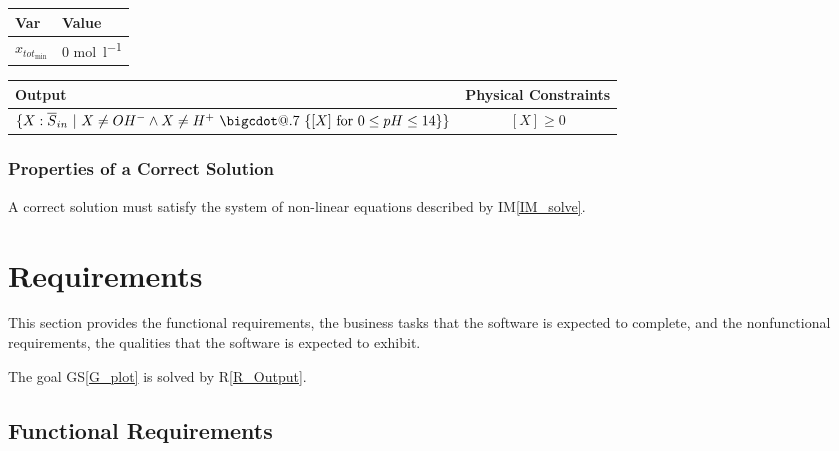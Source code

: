 \documentclass[12pt]{article}
\makeatletter
\newcommand*\bigcdot{\mathpalette\bigcdot@{.7}}
\newcommand*\bigcdot@[2]{\mathbin{\vcenter{\hbox{\scalebox{#2}{$\m@th#1\bullet$}}}}}
\newcommand{\gsref}[1]{GS\ref{#1}}
\newcommand{\iref}[1]{IM\ref{#1}}
\newcommand{\rref}[1]{R\ref{#1}}
\makeatother
\begin{document}
\begin{table}[!h]
\caption{Specification Parameter Values} \label{TblSpecParams}
\renewcommand{\arraystretch}{1.2}
\noindent \begin{longtable*}{l l} 
  \toprule
  \textbf{Var} & \textbf{Value} \\
  \midrule 
  $x_{{tot}_{\text{min}}}$ & 0 \si{\mole\per\litre}\\
  \bottomrule
\end{longtable*}
\end{table}

\begin{table}[!h]
\caption{Output Variables} \label{TblOutputVar}
\renewcommand{\arraystretch}{1.2}
\noindent \begin{longtable*}{l c} 
  \toprule
  \textbf{Output} & \textbf{Physical Constraints} \\
  \midrule 
  $\{X:\overline S_{in} ~|~ X \neq OH^- \land X \neq H^+ ~\bigcdot~ \{[X]~\textrm{for}~0 \leq pH \leq 14\} \}$ & $[X] \geq 0$
  \\
  \bottomrule
\end{longtable*}
\end{table}

\subsubsection{Properties of a Correct Solution} \label{sec_CorrectSolution}

\noindent
A correct solution must satisfy the system of non-linear equations described by \iref{IM_solve}. 

\section{Requirements}

This section provides the functional requirements, the business tasks that the
software is expected to complete, and the nonfunctional requirements, the
qualities that the software is expected to exhibit.

The goal \gsref{G_plot} is solved by \rref{R_Output}.

\subsection{Functional Requirements}
\end{document}
